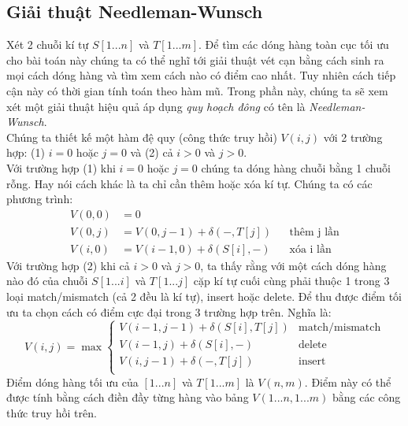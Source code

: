 \subsection{Giải thuật Needleman-Wunsch}
Xét 2 chuỗi kí tự $S[1...n]$ và $T[1...m]$. Để tìm các dóng hàng toàn cục tối ưu cho 
bài toán này chúng ta có thể nghĩ tới giải thuật vét cạn bằng cách sinh ra mọi cách 
dóng hàng và tìm xem cách nào có điểm cao nhất. Tuy nhiên cách tiếp cận này có thời
gian tính toán theo hàm mũ. Trong phần này, chúng ta sẽ xem xét một giải thuật hiệu quả
áp dụng \textit{quy hoạch đông} có tên là \textit{Needleman-Wunsch}. \\
Chúng ta thiết kế một hàm đệ quy (công thức truy hồi) $V(i,j)$ với 2 trường hợp: (1) $i = 0$ 
hoặc $j = 0$ và (2) cả $i > 0$ và $j > 0$. \\
Với trường hợp (1) khi $i = 0$ hoặc $j = 0$ chúng ta dóng hàng chuỗi bằng 1 chuỗi rỗng.
Hay nói cách khác là ta chỉ cần thêm hoặc xóa kí tự. Chúng ta có các phương trình:
\begin{equation}
    \begin{aligned}
        V(0, 0) &= 0 & \\
        V(0, j) &= V(0, j - 1) + \delta(-, T[j]) && \text{thêm j lần} \\
        V(i, 0) &= V(i -1, 0) + \delta(S[i], -) && \text{xóa i lần} 
    \end{aligned}
\end{equation}
Với trường hợp (2) khi cả $i > 0$ và $j > 0$, ta thấy rằng với một cách dóng hàng nào đó
của chuỗi $S[1...i]$ và $T[1...j]$ cặp kí tự cuối cùng phải thuộc 1 trong 3 loại 
match/mismatch (cả 2 đều là kí tự), insert hoặc delete. Để thu được điểm tối ưu ta chọn 
cách có điểm cực đại trong 3 trường hợp trên. Nghĩa là:
\begin{equation}
    V(i, j) = \max 
    \begin{cases}
        V(i - 1, j - 1) + \delta(S[i], T[j]) & \text{match/mismatch} \\
        V(i - 1, j) + \delta(S[i], -) & \text{delete} \\
        V(i, j - 1) + \delta(-, T[j]) & \text{insert} \\
    \end{cases}
\end{equation}
Điểm dóng hàng tối ưu của $[1...n]$ và $T[1...m]$ là $V(n,m)$. Điểm này có thể được tính bằng
cách điền đầy từng hàng vào bảng $V(1...n, 1...m)$ bằng các công thức truy hồi trên.